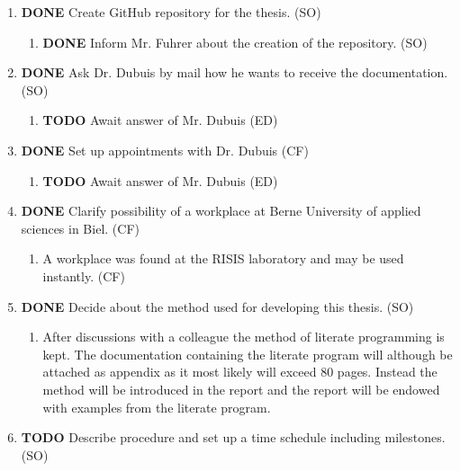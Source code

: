 \documentclass[10pt, openright, notitlepage]{scrreprt}
\begin{document}
\begin{enumerate}
\item {\bfseries\sffamily DONE} Create GitHub repository for the thesis. (SO)
\label{sec:orgf40d696}
\begin{enumerate}
\item {\bfseries\sffamily DONE} Inform Mr. Fuhrer about the creation of the repository. (SO)
\label{sec:org064df6b}
\end{enumerate}

\item {\bfseries\sffamily DONE} Ask Dr. Dubuis by mail how he wants to receive the documentation. (SO)
\label{sec:org14d5726}
\begin{enumerate}
\item {\bfseries\sffamily TODO} Await answer of Mr. Dubuis (ED)
\label{sec:orgfce8eaf}
\end{enumerate}

\item {\bfseries\sffamily DONE} Set up appointments with Dr. Dubuis (CF)
\label{sec:org958917d}
\begin{enumerate}
\item {\bfseries\sffamily TODO} Await answer of Mr. Dubuis (ED)
\label{sec:org80dea6f}
\end{enumerate}

\item {\bfseries\sffamily DONE} Clarify possibility of a workplace at Berne University of applied sciences in Biel. (CF)
\label{sec:org64cb8b9}
\begin{enumerate}
\item A workplace was found at the RISIS laboratory and may be used instantly. (CF)
\label{sec:orgfdbbbdd}
\end{enumerate}

\item {\bfseries\sffamily DONE} Decide about the method used for developing this thesis. (SO)
\label{sec:orgf30d83c}
\begin{enumerate}
\item After discussions with a colleague the method of literate programming is
\label{sec:org81d30dc}
kept. The documentation containing the literate program will although be
attached as appendix as it most likely will exceed 80 pages. Instead the
method will be introduced in the report and the report will be endowed
with examples from the literate program.
\end{enumerate}

\item {\bfseries\sffamily TODO} Describe procedure and set up a time schedule including milestones. (SO)
\label{sec:org84ed79d}
\end{enumerate}
\end{document}

